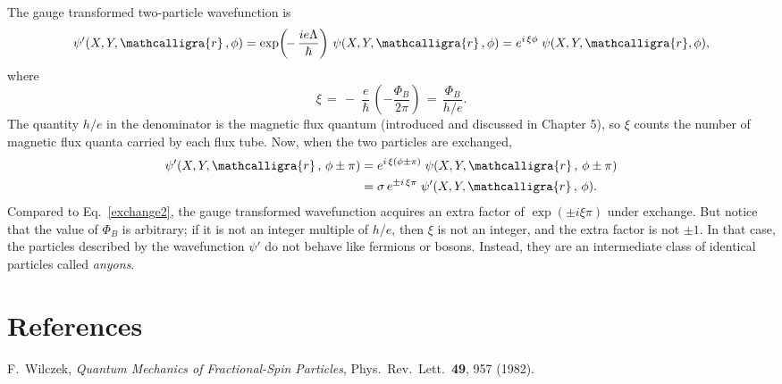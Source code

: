 \documentclass[pra,12pt]{revtex4}
\begin{document}
The gauge transformed two-particle wavefunction is
\begin{equation}
  \psi'(X, Y, \mathcalligra{r}\,, \phi)
  = \exp\!\left(\!-\,\frac{ie\Lambda}{\hbar}\right)\,
  \psi(X, Y, \mathcalligra{r}\,, \phi)
  = e^{i \, \xi \phi}\; \psi(X, Y, \mathcalligra{r}, \phi),
\end{equation}
where
\begin{equation}
  \xi \,=\, -\;\frac{e}{\hbar}\,\left(-\frac{\Phi_B}{2\pi}\right)
  \,=\, \frac{\Phi_B}{h/e}.
\end{equation}
The quantity $h/e$ in the denominator is the magnetic flux quantum
(introduced and discussed in Chapter 5), so $\xi$ counts the number of
magnetic flux quanta carried by each flux tube.  Now, when the two
particles are exchanged,
\begin{align}
  \psi'(X, Y, \mathcalligra{r}\,,\, \phi \pm \pi) &=
  e^{i \, \xi (\phi\pm \pi)} \;
  \psi(X, Y, \mathcalligra{r}\,,\, \phi \pm \pi) \\
  &= \sigma \,e^{\pm i \, \xi\pi}\;
  \psi'(X, Y, \mathcalligra{r}\,,\, \phi).
\end{align}
Compared to Eq.~\eqref{exchange2}, the gauge transformed wavefunction
acquires an extra factor of $\exp(\pm i \xi \pi)$ under exchange.  But
notice that the value of $\Phi_B$ is arbitrary; if it is not an
integer multiple of $h/e$, then $\xi$ is not an integer, and the extra
factor is not $\pm 1$.  In that case, the particles described by the
wavefunction $\psi'$ do not behave like fermions or bosons.  Instead,
they are an intermediate class of identical particles called
\textit{anyons}.

\section*{References}

\begin{enumerate}[[1{]}]
\item F.~Wilczek, \textit{Quantum Mechanics of Fractional-Spin Particles},
  Phys.~Rev.~Lett.~\textbf{49}, 957 (1982).
  \label{cite:wilczek}
\end{enumerate}
\end{document}
